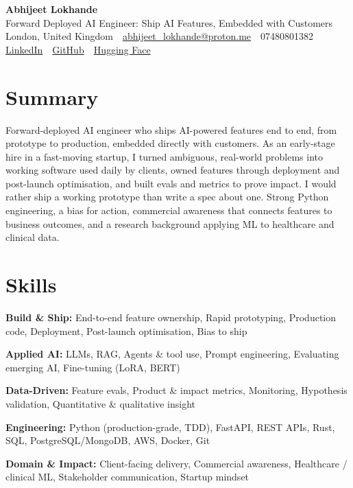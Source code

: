 \documentclass[10pt,a4paper]{article}
\newcommand{\sep}{\,\textcolor{accent!60}{\textbar}\,}
\begin{document}
\begin{center}
  {\fontsize{24}{26}\selectfont\bfseries Abhijeet Lokhande}\\[3pt]
  {\color{accent}\large Forward Deployed AI Engineer: Ship AI Features, Embedded with Customers}\\[5pt]
  {\small
    London, United Kingdom \sep
    \href{mailto:abhijeet_lokhande@proton.me}{abhijeet\_lokhande@proton.me} \sep
    07480801382 \\[2pt]
    \href{https://www.linkedin.com/in/ablds/}{LinkedIn} \sep
    \href{https://github.com/abhijeetscode}{GitHub} \sep
    \href{https://huggingface.co/ab-ai}{Hugging Face}
  }
\end{center}
\vspace{2pt}

\section{Summary}
Forward-deployed AI engineer who ships AI-powered features end to end, from prototype to production, embedded directly with customers. As an early-stage hire in a fast-moving startup, I turned ambiguous, real-world problems into working software used daily by clients, owned features through deployment and post-launch optimisation, and built evals and metrics to prove impact. I would rather ship a working prototype than write a spec about one. Strong Python engineering, a bias for action, commercial awareness that connects features to business outcomes, and a research background applying ML to healthcare and clinical data.

\section{Skills}
\begin{tight}
  \item[\textcolor{accent}{\small$\bullet$}] \textbf{Build \& Ship:} End-to-end feature ownership, Rapid prototyping, Production code, Deployment, Post-launch optimisation, Bias to ship
  \item[\textcolor{accent}{\small$\bullet$}] \textbf{Applied AI:} LLMs, RAG, Agents \& tool use, Prompt engineering, Evaluating emerging AI, Fine-tuning (LoRA, BERT)
  \item[\textcolor{accent}{\small$\bullet$}] \textbf{Data-Driven:} Feature evals, Product \& impact metrics, Monitoring, Hypothesis validation, Quantitative \& qualitative insight
  \item[\textcolor{accent}{\small$\bullet$}] \textbf{Engineering:} Python (production-grade, TDD), FastAPI, REST APIs, Rust, SQL, PostgreSQL/MongoDB, AWS, Docker, Git
  \item[\textcolor{accent}{\small$\bullet$}] \textbf{Domain \& Impact:} Client-facing delivery, Commercial awareness, Healthcare / clinical ML, Stakeholder communication, Startup mindset
\end{tight}
\end{document}
